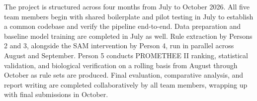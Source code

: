 \label{sec:planning}

The project is structured across four months from July to October 2026. All five team members
begin with shared boilerplate and pilot testing in July to establish a common codebase and verify
the pipeline end-to-end. Data preparation and baseline model training are completed in July as well.
Rule extraction by Persons 2 and 3, alongside the SAM intervention by Person 4, run in
parallel across August and September. Person 5 conducts PROMETHEE II ranking, statistical
validation, and biological verification on a rolling basis from August through October as rule
sets are produced. Final evaluation, comparative analysis, and report writing are completed
collaboratively by all team members, wrapping up with final submissions in October.

\vspace{1em}

